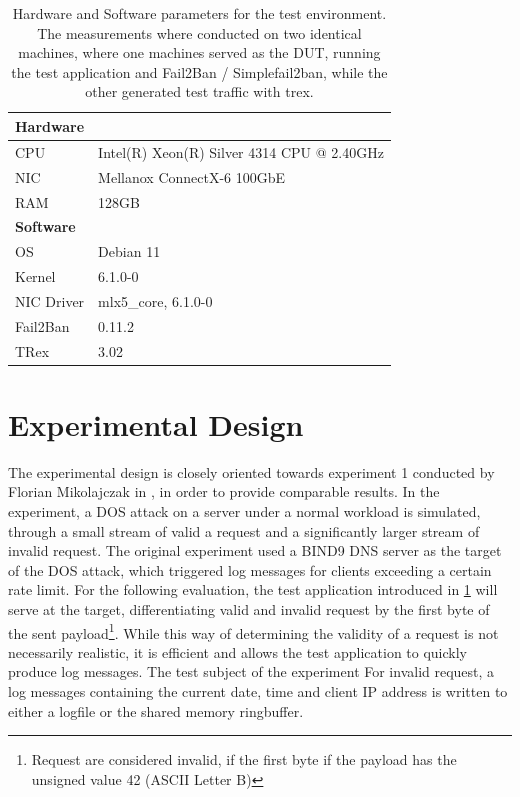 \begin{table}[b!]
	\renewcommand{\arraystretch}{1.5}
	\caption[Testbed Summary]{Hardware and Software parameters for the test environment. The measurements where conducted
	on two identical machines, where one machines served as the \ac{DUT}, running the test application and Fail2Ban / Simplefail2ban,
	while the other generated test traffic with trex.}
	 \label{tab:specs}
	 \centering
	\small
	\begin{tabular}{ll}
	\toprule
	\multicolumn{2}{l}{\textbf{Hardware}}                                        \\ \midrule
	CPU      & Intel(R) Xeon(R) Silver 4314 CPU @ 2.40GHz \\
	NIC      & Mellanox ConnectX-6 100GbE                       \\
	RAM        & 128GB                                                       \\ \bottomrule
	\multicolumn{2}{l}{\textbf{Software}}                                        \\ \midrule
	OS         & Debian 11                                                  \\
	Kernel          & 6.1.0-0                                                   \\
	NIC Driver & mlx5\_core, 6.1.0-0                                      \\
	Fail2Ban       & 0.11.2                                     \\
	TRex            & 3.02                                       \\ \bottomrule
	\end{tabular}
\end{table}

\section{Experimental Design}

The experimental design is closely oriented towards experiment 1 conducted by Florian Mikolajczak in \cite{mikolajczak2022}, in order to provide comparable results.
In the experiment, a \ac{DOS} attack on a server under a normal workload is simulated, through a small stream of valid a request and a significantly larger
stream of invalid request. The original experiment used a BIND9 DNS server as the target of the \ac{DOS} attack, which triggered log messages for clients exceeding a certain rate limit. For   
the following evaluation, the test application introduced in \ref{} will serve at the target, differentiating valid and invalid request by the first byte of the sent payload\footnote{Request are considered invalid, if the first byte if the payload has the unsigned value 42 (ASCII Letter B)}.
While this way of determining the validity of a request is not necessarily realistic, it is efficient and allows the test application to quickly produce log messages. The test subject 
of the experiment For invalid request, a log messages containing the current date, time and client IP address is written to either a logfile or the shared memory ringbuffer.  

